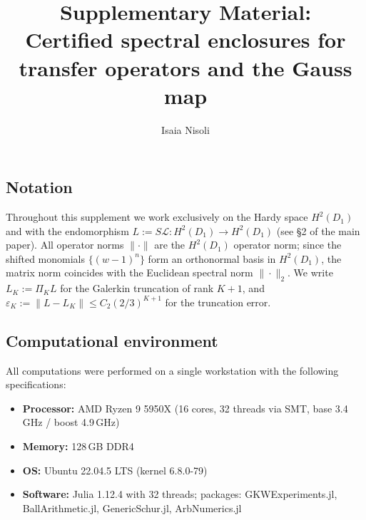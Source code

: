 \documentclass[11pt]{article}
\title{Supplementary Material:\\Certified spectral enclosures for transfer operators and the Gauss map}
\author{Isaia Nisoli}
\date{}
\begin{document}
\maketitle


\subsection*{Notation}

Throughout this supplement we work exclusively on the Hardy space $H^2(D_1)$
and with the endomorphism $L := S\mathcal L : H^2(D_1) \to H^2(D_1)$
(see \S2 of the main paper).
All operator norms $\|\cdot\|$ are the $H^2(D_1)$ operator norm;
since the shifted monomials $\{(w-1)^n\}$ form an orthonormal basis in $H^2(D_1)$,
the matrix norm coincides with the Euclidean spectral norm $\|\cdot\|_2$.
We write $L_K := \Pi_K L$ for the Galerkin truncation of rank $K+1$,
and $\varepsilon_K := \|L - L_K\| \leq C_2 (2/3)^{K+1}$ for
the truncation error.

\subsection*{Computational environment}

All computations were performed on a single workstation with the following specifications:
\begin{itemize}
\item \textbf{Processor:} AMD Ryzen 9 5950X (16 cores, 32 threads via SMT, base 3.4\,GHz / boost 4.9\,GHz)
\item \textbf{Memory:} 128\,GB DDR4
\item \textbf{OS:} Ubuntu 22.04.5 LTS (kernel 6.8.0-79)
\item \textbf{Software:} Julia 1.12.4 with 32 threads; packages: GKWExperiments.jl, BallArithmetic.jl, GenericSchur.jl, ArbNumerics.jl
\end{itemize}
\end{document}
